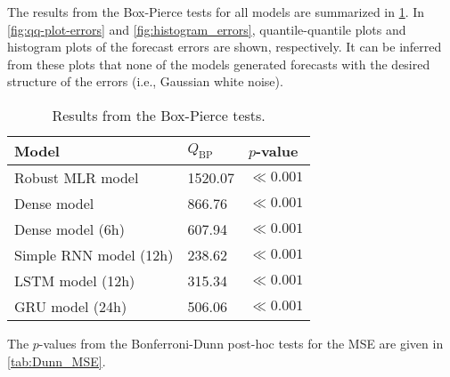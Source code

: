\label{chapt:appendix_C}

The results from the Box-Pierce tests for all models are summarized in \cref{tab:boxpierce}. In \cref{fig:qq-plot-errors} and \vref{fig:histogram_errors}, quantile-quantile plots and histogram plots of the forecast errors are shown, respectively. It can be inferred from these plots that none of the models generated forecasts with the desired structure of the errors (i.e., Gaussian white noise).
\begin{table}[h]
\small
\centering
\caption{Results from the Box-Pierce tests.}
\label{tab:boxpierce}
\begin{tabular}{@{}lll@{}}
\toprule
Model                  & $Q_{\text{BP}}$ & $p$-value             \\ \midrule
Robust MLR model       & 1520.07         & $\ll0.001$ \\
Dense model            & 866.76          & $\ll0.001$  \\
Dense model (6h)       & 607.94          & $\ll0.001$ \\
Simple RNN model (12h) & 238.62          & $\ll0.001$  \\
LSTM model (12h)       & 315.34          & $\ll0.001$  \\
GRU model (24h)        & 506.06          & $\ll0.001$ \\ \bottomrule
\end{tabular}
\end{table}

\noindent
The $p$-values from the Bonferroni-Dunn post-hoc tests for the MSE are given in \cref{tab:Dunn_MSE}. 

\begin{table}[h]
\centering
\caption{$p$-values for the pairwise comparisons from the Bonferroni-Dunn post-hoc test for the MSE. }
\label{tab:Dunn_MSE}
\end{table}

